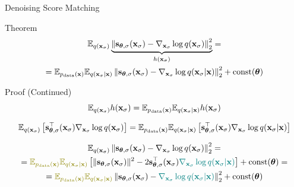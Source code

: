 \documentclass{beamer}
\renewcommand{\eqpause}{}
\renewcommand{\nextonslide}[1]{#1}
\begin{document}
\begin{frame}{Denoising Score Matching}
	\vspace{-0.3cm}
	\begin{block}{Theorem}
		\vspace{-0.7cm}
		\begin{multline*}
			\mathbb{E}_{q(\mathbf{x}_{\sigma})}\underbrace{\left\| \mathbf{s}_{\boldsymbol{\theta}, \sigma}(\mathbf{x}_{\sigma}) - \nabla_{\mathbf{x}_{\sigma}} \log q(\mathbf{x}_{\sigma}) \right\|_2^2}_{h(\mathbf{x}_{\sigma})} = \\
			= \mathbb{E}_{p_{\text{data}}(\mathbf{x})} \mathbb{E}_{q(\mathbf{x}_{\sigma} | \mathbf{x})}\left\| \mathbf{s}_{\boldsymbol{\theta}, \sigma}(\mathbf{x}_{\sigma}) - \nabla_{\mathbf{x}_{\sigma}} \log q(\mathbf{x}_{\sigma} | \mathbf{x}) \right\|_2^2 + \text{const}(\boldsymbol{\theta})
		\end{multline*}
		\vspace{-0.9cm}
	\end{block}
	\begin{block}{Proof (Continued)}
		\vspace{-0.3cm}
		\[
			\mathbb{E}_{q(\mathbf{x}_{\sigma})} h(\mathbf{x}_{\sigma})=  \mathbb{E}_{p_{\text{data}}(\mathbf{x})} \mathbb{E}_{q(\mathbf{x}_{\sigma} | \mathbf{x})}  h(\mathbf{x}_{\sigma})
		\]
        \eqpause
		{\small
		\[
			\mathbb{E}_{q(\mathbf{x}_{\sigma})} \left[\mathbf{s}_{\boldsymbol{\theta}, \sigma}^\top(\mathbf{x}_{\sigma}) \nabla_{\mathbf{x}_{\sigma}} \log q(\mathbf{x}_{\sigma}) \right] = \mathbb{E}_{p_{\text{data}}(\mathbf{x})} \mathbb{E}_{q(\mathbf{x}_{\sigma} | \mathbf{x})} \left[\mathbf{s}_{\boldsymbol{\theta}, \sigma}^\top(\mathbf{x}_{\sigma}) \nabla_{\mathbf{x}_{\sigma}} \log q(\mathbf{x}_{\sigma} | \mathbf{x}) \right]
		\]
        \eqpause
		\vspace{-0.5cm}
		\begin{multline*}
			\bbE_{q(\bx_{\sigma})}\left\| \bs_{\btheta, \sigma}(\bx_{\sigma}) - \nabla_{\bx_{\sigma}} \log q(\bx_{\sigma}) \right\|_2^2 = \\ 
			= {\color{olive}\bbE_{\pd(\bx)} \bbE_{q(\bx_{\sigma} | \bx)}}\left[\| \bs_{\btheta, \sigma}(\bx_{\sigma}) \|^2 - 2 \bs_{\btheta, \sigma}^\top(\bx_{\sigma}) {\color{teal}\nabla_{\bx_{\sigma}} \log q(\bx_{\sigma} | \bx)} \right] + \text{const}(\btheta)
			\nextonslide{= \\ = {\color{olive}\bbE_{\pd(\bx)} \bbE_{q(\bx_{\sigma} | \bx)}} \left\|\bs_{\btheta, \sigma}(\bx_{\sigma}) - {\color{teal}\nabla_{\bx_{\sigma}} \log q(\bx_{\sigma} | \bx)} \right\|_2^2 + \text{const}(\btheta)}
		\end{multline*}
		}
		\vspace{-0.8cm}
	\end{block}
\end{frame}
\end{document}
